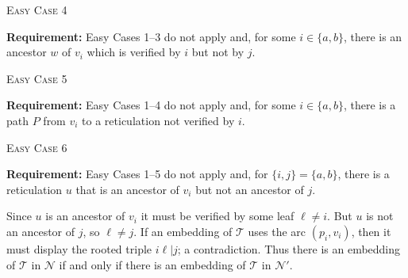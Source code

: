 \documentclass[11pt]{amsart}
\begin{document}
\begin{algorithm}[H]
 \caption{\textsc{Easy Case 4}}
\begin{algorithmic}[1]
 \Statex\textbf{Requirement:} Easy Cases 1--3 do not apply and, for some $i\in \{a, b\}$, there is an ancestor $w$ of $v_i$ which is verified by $i$ but not by $j$.
        \Else
        \EndIf
 \end{algorithmic}
\end{algorithm}

\begin{algorithm}[H]
 \caption{\textsc{Easy Case 5}}
\begin{algorithmic}[1]
 \Statex\textbf{Requirement:} Easy Cases 1--4 do not apply and, for some $i\in \{a, b\}$, there is a path $P$ from $v_i$ to a reticulation not verified by $i$.
 \end{algorithmic}
\end{algorithm}

\begin{algorithm}[H]
 \caption{\textsc{Easy Case 6}}
\begin{algorithmic}[1]
 \Statex\textbf{Requirement:} Easy Cases 1--5 do not apply and, for $\{i, j\}=\{a, b\}$, there is a reticulation $u$ that is an ancestor of $v_i$ but not an ancestor of $j$.
 \end{algorithmic}
\end{algorithm}
Since $u$ is an ancestor of $v_i$ it must be verified by some leaf $\ell\neq i$. But $u$ is not an ancestor of $j$, so $\ell\neq j$. If an embedding of ${{\mathcal T}}$ uses the arc $(p_i,v_i)$, then it must display the rooted triple $i\ell|j$; a contradiction. Thus there is an embedding of ${{\mathcal T}}$ in ${{\mathcal N}}$ if and only if there is an embedding of ${{\mathcal T}}$ in ${{\mathcal N}}'$. 
\end{document}
